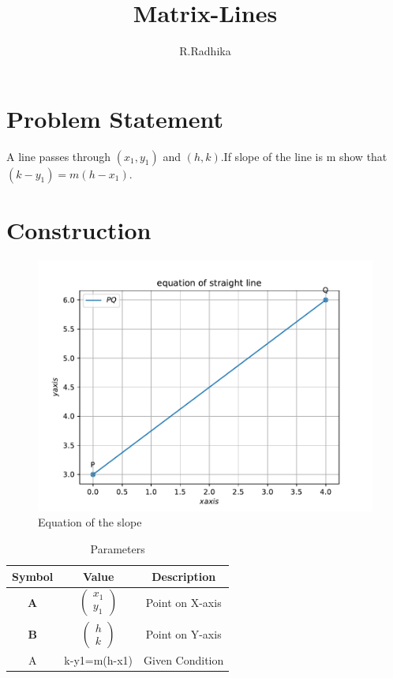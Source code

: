 \documentclass[journal,12pt,twocolumn]{IEEEtran}
\title{
Matrix-Lines
}
\author{R.Radhika}
\newcommand{\myvec}[1]{\ensuremath{\begin{pmatrix}#1\end{pmatrix}}}
\let\vec\mathbf
\begin{document}
\maketitle
\tableofcontents
\bigskip
\section{Problem Statement}
A line passes through $(x_1,y_1)$ and $(h,k)$.If slope of the line is m show that $(k-y_1)=m(h-x_1)$.\\
\section{Construction}
\begin{figure}[h]
    \centering
\includegraphics[width=\columnwidth]{figure.pdf}
    \caption{Equation of the slope}
    \label{fig:my_label}
\end{figure}
\vspace{2cm}
\begin{table}[h]
    \centering
    \begin{tabular}{|c|c|c|}
       \hline
       \textbf{Symbol}&\textbf{Value}&\textbf{Description}  \\
       \hline
	    $\vec{A}$ & $\myvec{
		    x_1\\
		    y_1}$
	    & Point on X-axis\\
        \hline
	    $\vec{B}$ & $\myvec{h\\k}$
 & Point on Y-axis\\
        \hline
        \hline
        A & k-y1=m(h-x1) & Given Condition\\
        \hline
    \end{tabular}
    \caption{Parameters}
    \label{tab:my_label}
\end{table}
\end{document}

